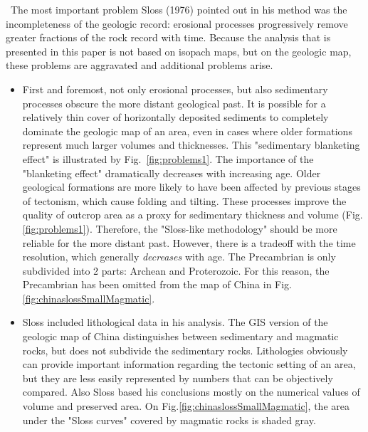 \documentclass{article}
\begin{document}
 ~\indent The  most important problem  Sloss (1976) pointed out  in his
 method  was  the incompleteness  of  the  geologic record:  erosional
 processes progressively  remove greater fractions of  the rock record
 with time.  Because  the analysis that is presented  in this paper is
 not based  on isopach maps, but  on the geologic  map, these problems
 are aggravated and additional problems arise.  \\
 \begin {itemize}

 \item  First and  foremost, not  only erosional  processes,  but also
 sedimentary processes obscure the more distant geological past. It is
 possible  for  a  relatively  thin cover  of  horizontally  deposited
 sediments to completely dominate the geologic map of an area, even in
 cases  where  older  formations  represent much  larger  volumes  and
 thicknesses. This  "sedimentary blanketing effect"  is illustrated by
 Fig.~\ref{fig:problems1}. The  importance of the  "blanketing effect"
 dramatically   decreases  with   increasing  age.   Older  geological
 formations are more  likely to have been affected  by previous stages
 of  tectonism,  which  cause  folding and  tilting.  These  processes
 improve  the quality  of  outcrop  area as  a  proxy for  sedimentary
 thickness  and   volume  (Fig.\ref{fig:problems1}).   Therefore,  the
 "Sloss-like methodology" should be more reliable for the more distant
 past.  However, there  is a tradeoff with the  time resolution, which
 generally  {\it  decreases}  with   age.   The  Precambrian  is  only
 subdivided into  2 parts: Archean  and Proterozoic. For  this reason,
 the  Precambrian has  been  omitted from  the  map of  China in  Fig.
 \ref{fig:chinaslossSmallMagmatic}.  \\

 \item  Sloss included  lithological  data in  his  analysis. The  GIS
 version  of   the  geologic   map  of  China   distinguishes  between
 sedimentary  and   magmatic  rocks,   but  does  not   subdivide  the
 sedimentary  rocks.   Lithologies  obviously  can  provide  important
 information regarding the  tectonic setting of an area,  but they are
 less  easily   represented  by   numbers  that  can   be  objectively
 compared. Also  Sloss based his  conclusions mostly on  the numerical
 values      of      volume      and     preserved      area.       On
 Fig.\ref{fig:chinaslossSmallMagmatic},  the  area  under  the  "Sloss
 curves" covered by magmatic rocks is shaded gray.
 \end{itemize}
\end{document}
